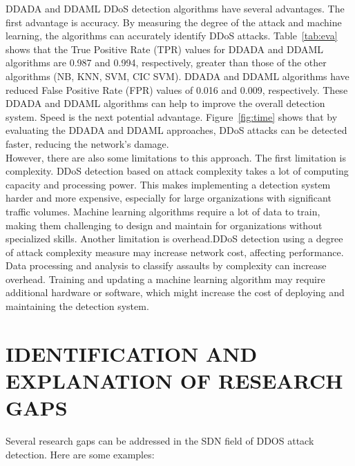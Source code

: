 \documentclass[12pt]{report}
\begin{document}
DDADA and DDAML DDoS detection algorithms have several advantages. The first advantage is accuracy. By measuring the degree of the attack and machine learning, the algorithms can accurately identify DDoS attacks. Table~\ref{tab:eva} shows that the True Positive Rate (TPR) values for DDADA and DDAML algorithms are 0.987 and 0.994, respectively, greater than those of the other algorithms (NB, KNN, SVM, CIC SVM). DDADA and DDAML algorithms have reduced False Positive Rate (FPR) values of 0.016 and 0.009, respectively. These DDADA and DDAML algorithms can help to improve the overall detection system. Speed is the next potential advantage. Figure~\ref{fig:time} shows that by evaluating the DDADA and DDAML approaches, DDoS attacks can be detected faster, reducing the network’s damage.\\

However, there are also some limitations to this approach. The first limitation is complexity. DDoS detection based on attack complexity takes a lot of computing capacity and processing power. This makes implementing a detection system harder and more expensive, especially for large organizations with significant traffic volumes. Machine learning algorithms require a lot of data to train, making them challenging to design and maintain for organizations without specialized skills. Another limitation is overhead.DDoS detection using a degree of attack complexity measure may increase network cost, affecting performance. Data processing and analysis to classify assaults by complexity can increase overhead. Training and updating a machine learning algorithm may require additional hardware or software, which might increase the cost of deploying and maintaining the detection system.\\


\section{IDENTIFICATION AND EXPLANATION OF RESEARCH GAPS}
Several research gaps can be addressed in the SDN field of DDOS attack detection. Here are some examples:
\end{document}
